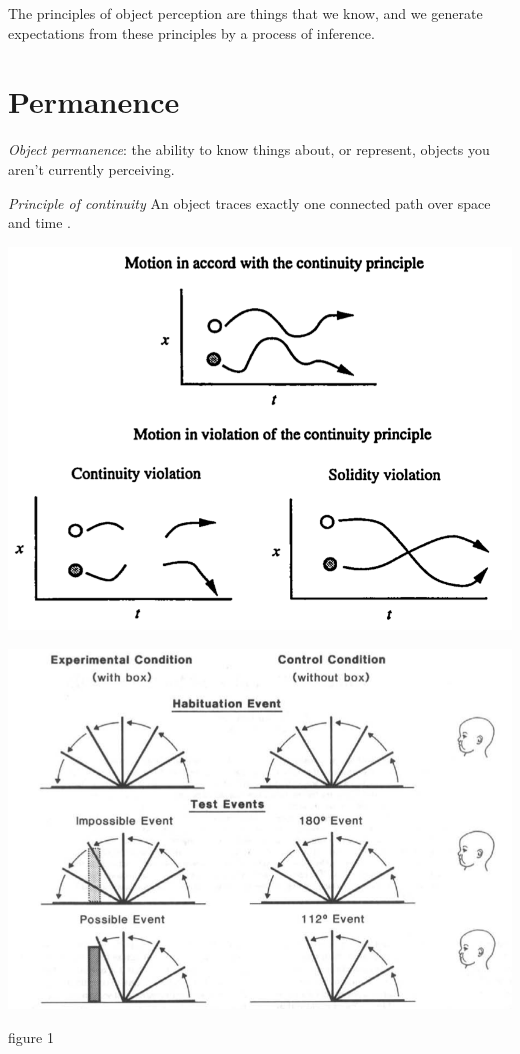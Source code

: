 \documentclass[12pt]{extarticle}
\begin{document}
\begin{multicols}{3}
The principles of object perception are things that we know, and we generate expectations from these principles by a process of inference.
 
 
 
\section{Permanence}
 
\textit{Object permanence}:
the ability to know things about, or represent, objects you aren't currently perceiving.
 
\emph{Principle of continuity} An object traces exactly one connected path over space and time \citep[p.\ 113]{spelke:1995_spatiotemporal}.
 
\begin{center}
\includegraphics[scale=0.3]{img/spelke_1995_fig1.neg.png}
\end{center}
\begin{center}
\includegraphics[scale=0.3]{img/baillargeon_1987_fig1.neg.png}
\end{center}
\begin{center} \citealp{baillargeon:1987_object} figure 1 \end{center}
 

\end{multicols}
\end{document}
